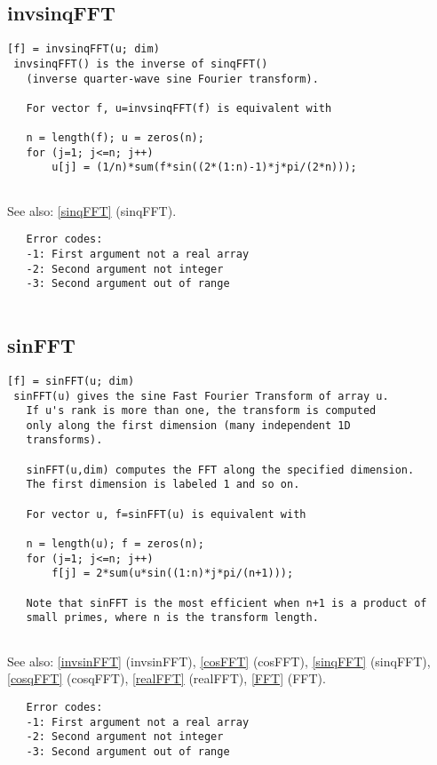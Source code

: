 \documentclass[a4paper]{article}
\begin{document}
\subsection{invsinqFFT\label{invsinqFFT}}

\begin{tscreen}
\begin{verbatim}
[f] = invsinqFFT(u; dim)
 invsinqFFT() is the inverse of sinqFFT()
   (inverse quarter-wave sine Fourier transform).
   
   For vector f, u=invsinqFFT(f) is equivalent with

   n = length(f); u = zeros(n);
   for (j=1; j<=n; j++)
       u[j] = (1/n)*sum(f*sin((2*(1:n)-1)*j*pi/(2*n)));
   
\end{verbatim}

See also: \ref{sinqFFT} {(sinqFFT)}.
\begin{verbatim}
   Error codes:
   -1: First argument not a real array
   -2: Second argument not integer
   -3: Second argument out of range
   
\end{verbatim}
\end{tscreen}



\subsection{sinFFT\label{sinFFT}}

\begin{tscreen}
\begin{verbatim}
[f] = sinFFT(u; dim)
 sinFFT(u) gives the sine Fast Fourier Transform of array u.
   If u's rank is more than one, the transform is computed
   only along the first dimension (many independent 1D
   transforms).

   sinFFT(u,dim) computes the FFT along the specified dimension.
   The first dimension is labeled 1 and so on.

   For vector u, f=sinFFT(u) is equivalent with

   n = length(u); f = zeros(n);
   for (j=1; j<=n; j++)
       f[j] = 2*sum(u*sin((1:n)*j*pi/(n+1)));

   Note that sinFFT is the most efficient when n+1 is a product of
   small primes, where n is the transform length.
           
\end{verbatim}

See also: \ref{invsinFFT} {(invsinFFT)}, \ref{cosFFT} {(cosFFT)}, \ref{sinqFFT} {(sinqFFT)}, \ref{cosqFFT} {(cosqFFT)}, \ref{realFFT} {(realFFT)}, \ref{FFT} {(FFT)}.
\begin{verbatim}
   Error codes:
   -1: First argument not a real array
   -2: Second argument not integer
   -3: Second argument out of range
   
\end{verbatim}
\end{tscreen}
\end{document}
